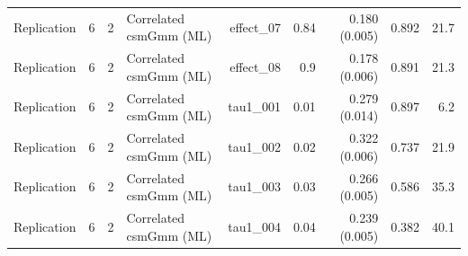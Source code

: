 \begin{longtable}{lcclrrrrr}
Replication & 6 & 2 & Correlated csmGmm (ML) & effect\_07 & 0.84 & 0.180 (0.005) & 0.892 & 21.7\\
Replication & 6 & 2 & Correlated csmGmm (ML) & effect\_08 & 0.9 & 0.178 (0.006) & 0.891 & 21.3\\
Replication & 6 & 2 & Correlated csmGmm (ML) & tau1\_001 & 0.01 & 0.279 (0.014) & 0.897 & 6.2\\
Replication & 6 & 2 & Correlated csmGmm (ML) & tau1\_002 & 0.02 & 0.322 (0.006) & 0.737 & 21.9\\
Replication & 6 & 2 & Correlated csmGmm (ML) & tau1\_003 & 0.03 & 0.266 (0.005) & 0.586 & 35.3\\
Replication & 6 & 2 & Correlated csmGmm (ML) & tau1\_004 & 0.04 & 0.239 (0.005) & 0.382 & 40.1\\
\bottomrule
\end{longtable}
